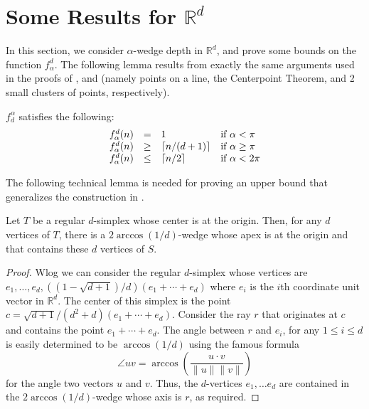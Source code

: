 \documentclass[lotsofwhite]{patmorin}
\begin{document}
\section{Some Results for $\mathbb{R}^d$}

In this section, we consider $\alpha$-wedge depth in $\mathbb{R}^d$,
and prove  some bounds on the function $f^d_\alpha$.  The following
lemma results from exactly the same arguments used in the proofs of
,  and  (namely points on a line, the
Centerpoint Theorem, and 2 small clusters of points, respectively).

\begin{lem}
$f^\alpha_d$ satisfies the following:
\[\begin{array}{lcll}
  f^d_\alpha(n) & = & 1 & \mbox{if $\alpha < \pi$} \\
  f^d_\alpha(n) & \ge & \left\lceil n/(d+1) \right\rceil & \mbox{if $\alpha \ge \pi$} \\
  f^d_\alpha(n) & \le & \left\lceil n/2 \right\rceil & \mbox{if $\alpha < 2\pi$} \\
\end{array}\]
\end{lem}

The following technical lemma is needed for proving an upper bound
that generalizes the construction in .

\begin{lem}
Let $T$ be a regular $d$-simplex whose center is at the origin.  Then,
for any $d$ vertices of $T$, there is a $2\arccos(1/d)$-wedge whose
apex is at the origin and that contains these $d$ vertices of $S$.
\end{lem}

\begin{proof} 
Wlog we can consider the regular $d$-simplex whose vertices are
$e_1,\ldots,e_d, ((1-\sqrt{d+1})/d)(e_1+\cdots+e_d)$ where $e_i$ is the
$i$th coordinate unit vector in $\mathbb{R}^d$.  The center of this
simplex is the point $c=\sqrt{d+1}/(d^2+d)(e_1+\cdots+ e_d)$.
Consider the ray $r$ that originates at $c$ and
contains the point $e_1+\cdots+e_d$.  The angle between $r$ and
$e_i$, for any $1\le i\le d$ is easily determined to be
$\arccos(1/d)$ using the famous formula 
\[
   \angle uv = \arccos \left(\frac{u\cdot v}{\|u\|\|v\|}\right) 
\]
for the angle two vectors $u$ and $v$.   Thus,
the $d$-vertices $e_1,\ldots e_d$ are contained in the
$2\arccos(1/d)$-wedge whose axis is $r$, as required.
\end{proof}
\end{document}
